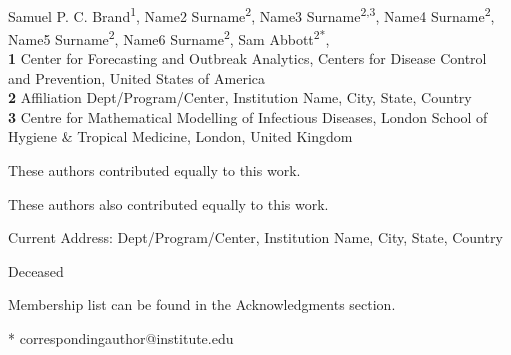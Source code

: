 \documentclass[10pt,letterpaper]{article}
\begin{document}
\vspace*{0.2in}

\begin{flushleft}
{\Large
\textbf{} %
}
\newline
\\
Samuel P. C. Brand\textsuperscript{1},
Name2 Surname\textsuperscript{2\Yinyang},
Name3 Surname\textsuperscript{2,3\textcurrency},
Name4 Surname\textsuperscript{2},
Name5 Surname\textsuperscript{2\ddag},
Name6 Surname\textsuperscript{2\ddag},
Sam Abbott\textsuperscript{2*},
\\
\bigskip
\textbf{1} \footnotesize Center for Forecasting and Outbreak Analytics, Centers for Disease Control and Prevention, United States of America
\\
\textbf{2} Affiliation Dept/Program/Center, Institution Name, City, State, Country
\\
\textbf{3} \footnotesize Centre for Mathematical Modelling of Infectious Diseases, London School of Hygiene \& Tropical Medicine, London, United Kingdom
\\
\bigskip

% 
%
\Yinyang These authors contributed equally to this work.

\ddag These authors also contributed equally to this work.

\textcurrency Current Address: Dept/Program/Center, Institution Name, City, State, Country %

\dag Deceased

\textpilcrow Membership list can be found in the Acknowledgments section.

* correspondingauthor@institute.edu

\end{flushleft}
\end{document}
